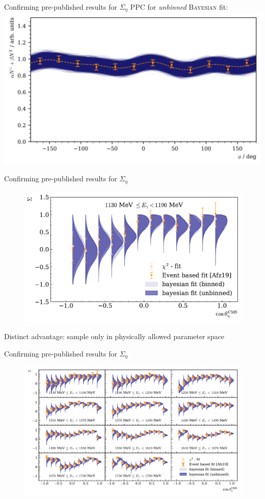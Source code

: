 \documentclass[11pt,aspectratio=169,dvipsnames]{beamer}
\begin{document}
\begin{frame}{Confirming pre-published results for $\Sigma_\eta$}
	PPC for \emph{unbinned} \textsc{Bayesian} fit:
	\centering
	\includegraphics[width=.9\linewidth]{../../bayes/event_based_fit/plots/eff_PPC.png}
\end{frame}
\begin{frame}{Confirming pre-published results for $\Sigma_\eta$}
	\begin{figure}
		\centering
		\includegraphics[width=.8\linewidth]{../../bayes/event_based_fit/plots/sigma_eta_bin.pdf}
	\end{figure}
	Distinct advantage: sample only in physically allowed parameter space
\end{frame}
	\begin{frame}{Confirming pre-published results for $\Sigma_\eta$}
		\begin{figure}
			\centering
			\includegraphics[width=.95\linewidth]{../../bayes/event_based_fit/plots/sigma_eta.pdf}
		\end{figure}
	\end{frame}
	
\end{document}

